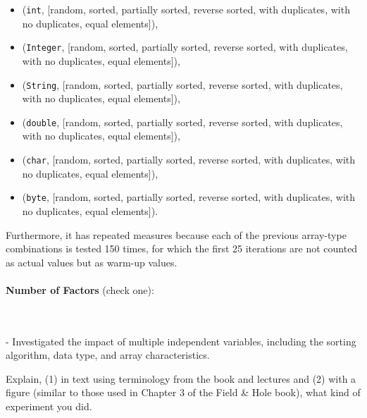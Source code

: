 \documentclass{article}
\begin{document}
\begin{itemize}
    \item (\texttt{int}, [random, sorted, partially sorted, reverse sorted, with duplicates, with no duplicates, equal elements]),
    \item (\texttt{Integer}, [random, sorted, partially sorted, reverse sorted, with duplicates, with no duplicates, equal elements]),
    \item (\texttt{String}, [random, sorted, partially sorted, reverse sorted, with duplicates, with no duplicates, equal elements]),
    \item (\texttt{double}, [random, sorted, partially sorted, reverse sorted, with duplicates, with no duplicates, equal elements]),
    \item (\texttt{char}, [random, sorted, partially sorted, reverse sorted, with duplicates, with no duplicates, equal elements]),
    \item (\texttt{byte}, [random, sorted, partially sorted, reverse sorted, with duplicates, with no duplicates, equal elements]).
\end{itemize}

Furthermore, it has repeated measures because each of the previous array-type combinations is tested 150 times, for which the first 25 iterations are not counted as actual values but as warm-up values.
\\\\
\textbf{Number of Factors} (check one):\\
\noindent
\begin{minipage}{0.4\textwidth}
\end{minipage}%
\begin{minipage}{0.4\textwidth}
\end{minipage}%
\begin{minipage}{0.0\textwidth}
\end{minipage}\\\\
- Investigated the impact of multiple independent variables, including the sorting algorithm, data type, and array characteristics.

Explain, (1) in text using terminology from the book and lectures and (2) with a figure (similar to those used in Chapter 3 of the Field \& Hole book), what kind of experiment you did.
\end{document}
